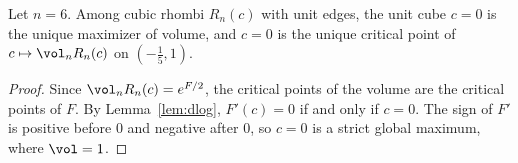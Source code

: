 \begin{theorem}\label{thm:main}
Let $n=6$. Among cubic rhombi $R_n(c)$ with unit edges, the unit cube $c=0$ is the unique maximizer of volume, and $c=0$ is the unique critical point of $c\mapsto\vol_nR_n(c)$ on $(- \frac{1}{5},1)$.
\end{theorem}
\begin{proof}
Since $\vol_nR_n(c)=e^{F/2}$, the critical points of the volume are the critical points of $F$.
By Lemma~\ref{lem:dlog}, $F'(c)=0$ if and only if $c=0$.
The sign of $F'$ is positive before $0$ and negative after $0$, so $c=0$ is a strict global maximum, where $\vol=1$.
\end{proof}
